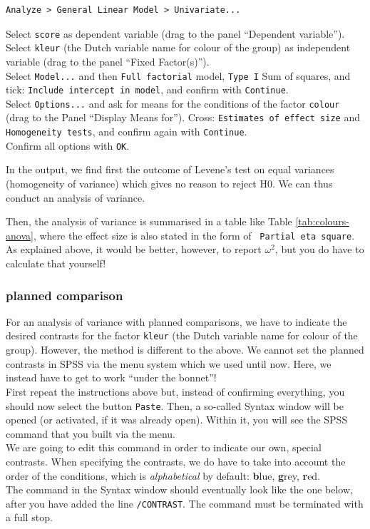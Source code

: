 \documentclass[
]{book}
\begin{document}
\begin{verbatim}
Analyze > General Linear Model > Univariate...
\end{verbatim}

Select \texttt{score} as dependent variable (drag to the panel
``Dependent variable'').\\
Select \texttt{kleur} (the Dutch variable name for colour of the group) as independent variable (drag to the panel ``Fixed
Factor(s)'').\\
Select \texttt{Model...} and then \texttt{Full\ factorial} model, \texttt{Type\ I} Sum
of squares, and tick: \texttt{Include\ intercept\ in\ model}, and confirm with
\texttt{Continue}.\\
Select \texttt{Options...} and ask for means for the conditions
of the factor \texttt{colour} (drag to the Panel ``Display Means for''). Cross:
\texttt{Estimates\ of\ effect\ size} and \texttt{Homogeneity\ tests}, and confirm again with
\texttt{Continue}.\\
Confirm all options with \texttt{OK}.

In the output, we find first the outcome of Levene's test on equal
variances (homogeneity of variance) which gives no reason to reject
H0. We can thus conduct an analysis of variance.

Then, the analysis of variance is summarised in a table like Table
\ref{tab:colours-anova}, where the effect size is also stated in
the form of \texttt{~Partial\ eta\ square}.
As explained above, it would be better, however, to report
\(\omega^2\), but you do have to calculate that yourself!

\hypertarget{planned-comparison}{%
\subsubsection{planned comparison}\label{planned-comparison}}

For an analysis of variance with planned comparisons, we have to
indicate the desired contrasts for the factor \texttt{kleur}
(the Dutch variable name for colour of the group).
However, the method
is different to the above. We cannot set the planned contrasts in SPSS
via the menu system which we used until now. Here, we instead have
to get to work ``under the bonnet''!\\
First repeat the instructions above but, instead of confirming everything,
you should now select the button \texttt{Paste}. Then, a so-called Syntax window
will be opened (or activated, if it was already open). Within it, you
will see the SPSS command that you built via the menu.\\
We are going to edit this command in order to indicate our own, special
contrasts. When specifying the contrasts, we do have to take into
account the order of the conditions, which is \emph{alphabetical} by default: \textbf{b}lue, \textbf{g}rey,
\textbf{r}ed.\\
The command in the Syntax window should eventually look like the one
below, after you have added the line \texttt{/CONTRAST}. The command
must be terminated with a full stop.\\
\end{document}
